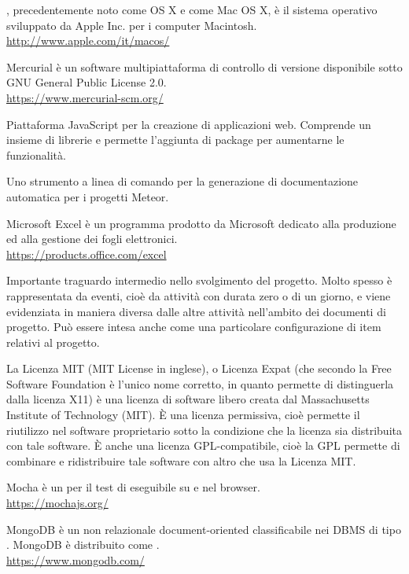 \Macos, precedentemente noto come OS X e come Mac OS X, è il sistema operativo sviluppato da Apple Inc. per i computer Macintosh.\\
\url{http://www.apple.com/it/macos/}

Mercurial è un software multipiattaforma di controllo di versione disponibile sotto GNU General Public License 2.0.\\
\url{https://www.mercurial-scm.org/}

Piattaforma JavaScript per la creazione di applicazioni web. Comprende un insieme di librerie e permette l'aggiunta di package per aumentarne le funzionalità.

Uno strumento a linea di comando per la generazione di documentazione automatica per i progetti Meteor.

Microsoft Excel è un programma prodotto da Microsoft dedicato alla produzione ed alla gestione dei fogli elettronici.\\
\url{https://products.office.com/excel}

Importante traguardo intermedio nello svolgimento del progetto. Molto spesso è rappresentata da eventi, cioè da attività con durata zero o di un giorno, e viene evidenziata in maniera diversa dalle altre attività nell'ambito dei documenti di progetto. Può essere intesa anche come una particolare configurazione di item relativi al progetto.

La Licenza MIT (MIT License in inglese), o Licenza Expat (che secondo la Free Software Foundation è l'unico nome corretto, in quanto permette di distinguerla dalla licenza X11) è una licenza di software libero creata dal Massachusetts Institute of Technology (MIT). \`{E} una licenza permissiva, cioè permette il riutilizzo nel software proprietario sotto la condizione che la licenza sia distribuita con tale software. \`{E} anche una licenza GPL-compatibile, cioè la GPL permette di combinare e ridistribuire tale software con altro che usa la Licenza MIT.

Mocha è un  per il test di  eseguibile su  e nel browser.\\
\url{https://mochajs.org/}

MongoDB è un  non relazionale document-oriented classificabile nei DBMS di tipo . MongoDB è distribuito come  .\\
\url{https://www.mongodb.com/}

\clearpage
